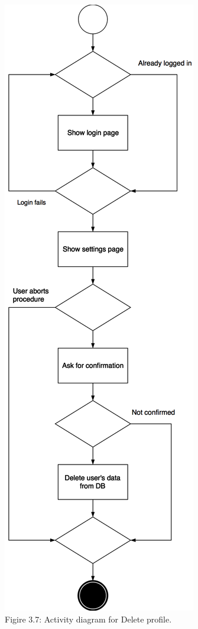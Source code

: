 \documentclass{article}
\begin{document}
	\begin{center}
		\includegraphics[scale=0.25]{img/diagrams/delete_profile_ad.png} \\ \bigskip
		Figire 3.7: Activity diagram for Delete profile.
	\end{center}
	\newpage
	
\end{document}

